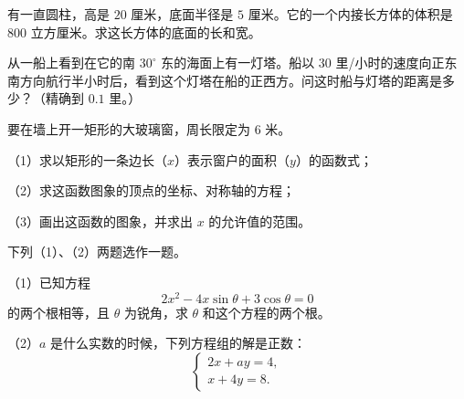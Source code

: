 \begin{question}
有一直圆柱，高是 $20$ 厘米，底面半径是 $5$ 厘米。它的一个内接长方体的体积是 $800$ 立方厘米。求这长方体的底面的长和宽。

\end{question}
\begin{question}
从一船上看到在它的南 $30^\circ$ 东的海面上有一灯塔。船以 $30$ 里/小时的速度向正东南方向航行半小时后，看到这个灯塔在船的正西方。问这时船与灯塔的距离是多少？（精确到 $0.1$ 里。）

\end{question}
\begin{question}
要在墙上开一矩形的大玻璃窗，周长限定为 $6$ 米。

（1）求以矩形的一条边长（$x$）表示窗户的面积（$y$）的函数式；

（2）求这函数图象的顶点的坐标、对称轴的方程；

（3）画出这函数的图象，并求出 $x$ 的允许值的范围。

\end{question}
\begin{question}
下列（1）、（2）两题选作一题。

（1）已知方程
\nopagebreak[4]
\[
2x^2-4x\sin\theta+3\cos\theta=0
\]
的两个根相等，且 $\theta$ 为锐角，求 $\theta$ 和这个方程的两个根。

（2）$a$ 是什么实数的时候，下列方程组的解是正数：
\nopagebreak[4]
\[
\begin{cases}
2x+ay=4,\\
x+4y=8.
\end{cases}
\]

\end{question}